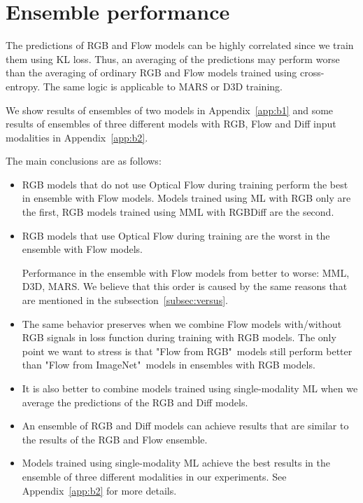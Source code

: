 \documentclass[conference]{IEEEtran}
\begin{document}
\section{Ensemble performance} \label{sec:ensemble}

The predictions of RGB and Flow models can be highly correlated since we train them using KL loss. Thus, an averaging of the predictions may perform worse than the averaging of ordinary RGB and Flow models trained using cross-entropy. The same logic is applicable to MARS or D3D training.

We show results of ensembles of two models in Appendix~\ref{app:b1} and some results of ensembles of three different models with RGB, Flow and Diff input modalities in Appendix~\ref{app:b2}.

The main conclusions are as follows: 
\begin{itemize}
	\item RGB models that do not use Optical Flow during training perform the best in ensemble with Flow models. Models trained using ML with RGB only are the first, RGB models trained using MML with RGBDiff are the second.
	
	\item RGB models that use Optical Flow during training are the worst in the ensemble with Flow models.
	
	Performance in the ensemble with Flow models from better to worse: MML, D3D, MARS. We believe that this order is caused by the same reasons that are mentioned in the subsection~\ref{subsec:versus}.

	\item The same behavior preserves when we combine Flow models with/without RGB signals in loss function during training with RGB models. The only point we want to stress is that "Flow from RGB"\ models still perform better than "Flow from ImageNet"\ models in ensembles with RGB models.
	
	\item It is also better to combine models trained using single-modality ML when we average the predictions of the RGB and Diff models. 
	
	\item An ensemble of RGB and Diff models can achieve results that are similar to the results of the RGB and Flow ensemble.
	
	\item Models trained using single-modality ML achieve the best results in the ensemble of three different modalities in our experiments. See Appendix~\ref{app:b2} for more details.	
	
\end{itemize}
\end{document}
